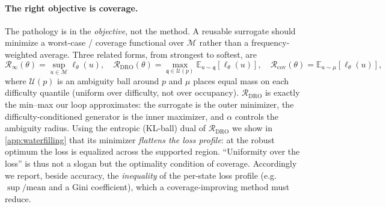 \documentclass{article}
\theoremstyle{plain}
\theoremstyle{definition}
\theoremstyle{remark}
\newcommand{\E}{\mathbb{E}}
\newcommand{\state}{u}
\newcommand{\manifold}{\mathcal{M}}
\newcommand{\lossf}{\ell_\theta}
\newcommand{\pnat}{p}
\newcommand{\Rinf}{\mathcal{R}_{\infty}}
\newcommand{\Rcov}{\mathcal{R}_{\mathrm{cov}}}
\newcommand{\Rdro}{\mathcal{R}_{\mathrm{DRO}}}
\newcommand{\unif}{\alpha}
\begin{document}
\paragraph{The right objective is coverage.}
The pathology is in the \emph{objective}, not the method. A reusable surrogate should minimize a
worst-case / coverage functional over $\manifold$ rather than a frequency-weighted average. Three
related forms, from strongest to softest, are
\begin{equation}
  \Rinf(\theta)=\!\sup_{\state\in\manifold}\!\lossf(\state),
  \quad
  \Rdro(\theta)=\!\!\max_{\mathfrak{q}\in\mathcal{U}(\pnat)}\!\E_{\state\sim\mathfrak{q}}[\lossf(\state)],
  \quad
  \Rcov(\theta)=\E_{\state\sim\mu}[\lossf(\state)],
  \label{eq:objectives}
\end{equation}
where $\mathcal{U}(\pnat)$ is an ambiguity ball around $\pnat$ and $\mu$ places equal mass on each
difficulty quantile (uniform over difficulty, not over occupancy). $\Rdro$ is exactly the min--max our
loop approximates: the surrogate is the outer minimizer, the difficulty-conditioned generator is the
inner maximizer, and $\unif$ controls the ambiguity radius. Using the entropic (KL-ball) dual of
$\Rdro$ we show in \cref{app:waterfilling} that its minimizer \emph{flattens the loss profile}: at the
robust optimum the loss is equalized across the supported region. ``Uniformity over the loss'' is thus
not a slogan but the optimality condition of coverage. Accordingly we report, beside accuracy, the
\emph{inequality} of the per-state loss profile (e.g.\ $\sup/\mathrm{mean}$ and a Gini coefficient),
which a coverage-improving method must reduce.
\end{document}

